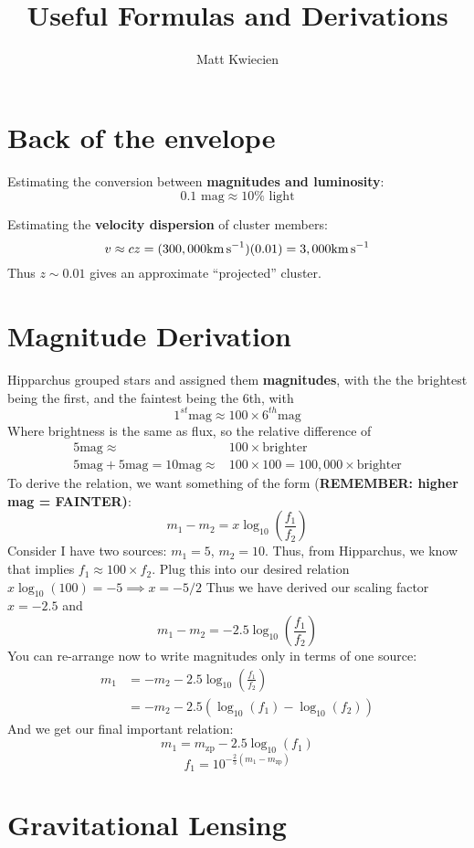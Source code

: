 \documentclass{article}
\title{Useful Formulas and Derivations}
\author{Matt Kwiecien}
\begin{document}
\maketitle


\section{Back of the envelope}

Estimating the conversion between \textbf{magnitudes and luminosity}:
$$0.1 \textrm{ mag} \approx 10\%\textrm{ light}$$

Estimating the \textbf{velocity dispersion} of cluster members:
$$v \approx cz = (300,000 \mathrm{km\,s}^{-1})(0.01) = 3,000 \mathrm{km\,s}^{-1}$$
Thus $z\sim 0.01$ gives an approximate ``projected'' cluster.


\section{Magnitude Derivation}
Hipparchus grouped stars and assigned them \textbf{magnitudes}, with the the brightest being the first, and the faintest being the 6th, with 
$$1^{st}\textrm{mag} \approx 100 \times 6^{th}\textrm{mag}$$
Where brightness is the same as flux, so the relative difference of
\begin{align*}
    5\textrm{mag} \approx & 100 \times \textrm{brighter}\\
    5\textrm{mag} + 5\textrm{mag} =  10\textrm{mag} \approx & 100 \times 100 = 100,000 \times \textrm{brighter}
\end{align*}
To derive the relation, we want something of the form (\textbf{REMEMBER: higher mag = FAINTER)}:
$$
m_1 - m_2 = x \log_{10}\left(\frac{f_1}{f_2}\right)
$$
Consider I have two sources: $m_1 = 5$, $m_2 = 10$.  Thus, from Hipparchus, we know that implies $f_1 \approx 100 \times f_2$. Plug this into our desired relation $x\log_{10}(100) = -5 \implies x = -5/2$
Thus we have derived our scaling factor $x = -2.5$ and
$$
m_1 - m_2 = -2.5 \log_{10}\left( \frac{f_1}{f_2} \right)
$$
You can re-arrange now to write magnitudes only in terms of one source:
\begin{align*}
    m_1 & = - m_2 - 2.5\log_{10}\left( \frac{f_1}{f_2} \right) \\
     & = - m_2 - 2.5(\log_{10}(f_1) - \log_{10}(f_2))
\end{align*}
And we get our final important relation:
$$m_1 = m_{\textrm{zp}} -2.5 \log_{10}(f_1)$$
$$
f_1 = 10^{-\frac{2}{5}(m_1-m_{\textrm{zp}})}
$$

\section{Gravitational Lensing}



\end{document}
